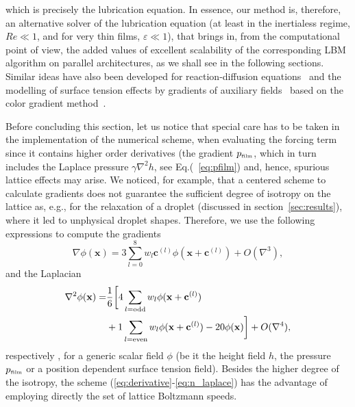 which is precisely the lubrication equation.
In essence, our method is, therefore, an alternative solver of the lubrication equation (at least in the inertialess regime, $Re \ll 1$, 
and for very thin films, $\varepsilon \ll 1$), that brings in, from the computational point of view, the added values of excellent scalability of the
corresponding LBM algorithm on parallel architectures, as we shall see in the
following sections. Similar ideas have also been developed for 
reaction-diffusion equations~\cite{PhysRevA.45.5771,Kingdon_1992,CHEN1995617,WEIMAR1996207} 
and the modelling of surface tension effects by gradients of auxiliary fields~\cite{PhysRevE.54.5041, PhysRevE.67.036701} based on the color gradient method~\cite{PhysRevA.43.4320}.

Before concluding this section, let us notice that special care has to be taken
in the implementation of the numerical scheme, when evaluating the
forcing term since it contains higher order derivatives (the gradient $p_{\mbox{\tiny{film}}}$,
which in turn includes the Laplace
 pressure $\gamma \nabla^2 h$, see Eq.(~\ref{eq:pfilm}) and, hence,
 spurious lattice effects may arise.  
We noticed, for example, that a centered scheme to calculate gradients \cite{zhou2004lattice}
does not guarantee the sufficient degree of isotropy on the lattice as, e.g., for the relaxation of
a droplet (discussed in section~\ref{sec:results}), where it led to unphysical droplet shapes.
Therefore, we use the following expressions to compute the gradients
\begin{equation}\label{eq:derivative}
    \nabla \phi(\mathbf{x}) = 3\sum_{l=0}^8w_l\mathbf{c}^{(l)} \phi(\mathbf{x}+\mathbf{c}^{(l)})+O(\nabla^3),
\end{equation}
and the Laplacian 
\begin{align}\label{eq:n_laplace}
    \nabla^2 \phi(\mathbf{x}) =& \frac{1}{6}\bigg[4\sum_{l = {\rm odd}} w_l \phi(\mathbf{x}+\mathbf{c}^{(l)})\nonumber\\ 
    &+ 1\sum_{l = {\rm even}} w_l \phi(\mathbf{x}+\mathbf{c}^{(l)}) - 20\phi(\mathbf{x}) \bigg] + O(\nabla^4),
\end{align}
respectively \cite{doi:10.1137/S1064827599357188,THAMPI20131}, for a generic scalar field $\phi$ 
(be it the height field $h$, the pressure $p_{\mbox{\tiny{film}}}$ or a position dependent surface tension field).
Besides the higher degree of the isotropy, the scheme 
(\ref{eq:derivative}-\ref{eq:n_laplace}) has the advantage of employing directly the set of lattice Boltzmann speeds. 

